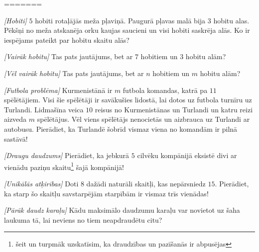 =======





\noindent 

\begin{problem}
\textit{[Hobiti]}
$5$ hobiti rotaļājās meža pļaviņā. Paugurā pļavas malā bija $3$ hobitu alas. Pēkšņi no meža atskanēja orku kaujas saucieni un visi hobiti saskrēja alās. Ko ir iespējams pateikt par hobitu skaitu alās?
\end{problem}


\begin{problem}
\textit{[Vairāk hobitu]}
Tas pats jautājums, bet ar $7$ hobitiem un $3$ hobitu alām?
\end{problem}

\begin{problem}
\textit{[Vēl vairāk hobitu]}
Tas pats jautājums, bet ar $n$ hobitiem un $m$ hobitu alām?
\end{problem}

\begin{problem}
\textit{[Futbola problēma]}
Kurmenistānā ir $m$ futbola komandas, katrā pa $11$ spēlētājiem. Visi šie spēlētāji ir savākušies lidostā, lai dotos uz futbola turnīru uz Turlandi. Lidmašīna veica $10$ reisus no Kurmenistānas un Turlandi un katru reizi aizveda $m$ spēlētājus. Vēl viens spēlētājs nenocietās un aizbrauca uz Turlandi ar autobusu. Pierādiet, ka Turlandē šobrīd vismaz viena no komandām ir pilnā sastāvā!

\end{problem}

\begin{problem}
\textit{[Draugu daudzums]}
Pierādiet, ka jebkurā $5$ cilvēku kompānijā eksistē divi ar vienādu paziņu skaitu\footnote{šeit un turpmāk uzskatīsim, ka draudzības un pazīšanās ir abpusējas} šajā kompānijā!
\end{problem}

\begin{problem}
\textit{[Unikālās atķirības]}
Doti $8$ dažādi naturāli skaitļi, kas nepārsniedz $15$. Pierādiet, ka starp šo skaitļu savstarpējām starpībām ir vismaz trīs vienādas!
\end{problem}

\begin{problem}
\textit{[Pārāk daudz karaļu]}
Kādu maksimālo daudzumu karaļu var novietot uz šaha laukuma tā, lai neviens no tiem neapdraudētu citu?
\end{problem}

